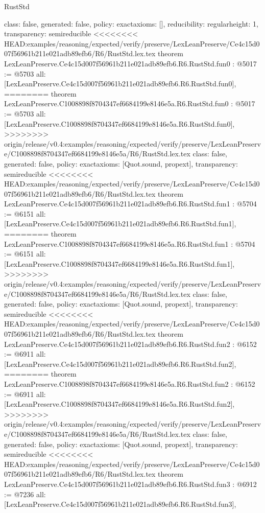 \begin{lexlean}{RustStd}
\begin{coremodule}
{\begin{coremodule}
{{{  class: false,
  generated: false,
  policy: exact{axioms: []},
  reducibility: regular{height: 1},
  transparency: semireducible
}
<<<<<<<< HEAD:examples/reasoning/expected/verify/preserve/LexLeanPreserve/Ce4c15d007f56961b211e021adb89efb6/R6/RustStd.lex.tex
theorem LexLeanPreserve.Ce4c15d007f56961b211e021adb89efb6.R6.RustStd.fun0 : @5017 := @5703 {
  all: [LexLeanPreserve.Ce4c15d007f56961b211e021adb89efb6.R6.RustStd.fun0],
========
theorem LexLeanPreserve.C1008898f8704347ef6684199e8146e5a.R6.RustStd.fun0 : @5017 := @5703 {
  all: [LexLeanPreserve.C1008898f8704347ef6684199e8146e5a.R6.RustStd.fun0],
>>>>>>>> origin/release/v0.4:examples/reasoning/expected/verify/preserve/LexLeanPreserve/C1008898f8704347ef6684199e8146e5a/R6/RustStd.lex.tex
  class: false,
  generated: false,
  policy: exact{axioms: [Quot.sound, propext]},
  transparency: semireducible
}
<<<<<<<< HEAD:examples/reasoning/expected/verify/preserve/LexLeanPreserve/Ce4c15d007f56961b211e021adb89efb6/R6/RustStd.lex.tex
theorem LexLeanPreserve.Ce4c15d007f56961b211e021adb89efb6.R6.RustStd.fun1 : @5704 := @6151 {
  all: [LexLeanPreserve.Ce4c15d007f56961b211e021adb89efb6.R6.RustStd.fun1],
========
theorem LexLeanPreserve.C1008898f8704347ef6684199e8146e5a.R6.RustStd.fun1 : @5704 := @6151 {
  all: [LexLeanPreserve.C1008898f8704347ef6684199e8146e5a.R6.RustStd.fun1],
>>>>>>>> origin/release/v0.4:examples/reasoning/expected/verify/preserve/LexLeanPreserve/C1008898f8704347ef6684199e8146e5a/R6/RustStd.lex.tex
  class: false,
  generated: false,
  policy: exact{axioms: [Quot.sound, propext]},
  transparency: semireducible
}
<<<<<<<< HEAD:examples/reasoning/expected/verify/preserve/LexLeanPreserve/Ce4c15d007f56961b211e021adb89efb6/R6/RustStd.lex.tex
theorem LexLeanPreserve.Ce4c15d007f56961b211e021adb89efb6.R6.RustStd.fun2 : @6152 := @6911 {
  all: [LexLeanPreserve.Ce4c15d007f56961b211e021adb89efb6.R6.RustStd.fun2],
========
theorem LexLeanPreserve.C1008898f8704347ef6684199e8146e5a.R6.RustStd.fun2 : @6152 := @6911 {
  all: [LexLeanPreserve.C1008898f8704347ef6684199e8146e5a.R6.RustStd.fun2],
>>>>>>>> origin/release/v0.4:examples/reasoning/expected/verify/preserve/LexLeanPreserve/C1008898f8704347ef6684199e8146e5a/R6/RustStd.lex.tex
  class: false,
  generated: false,
  policy: exact{axioms: [Quot.sound, propext]},
  transparency: semireducible
}
<<<<<<<< HEAD:examples/reasoning/expected/verify/preserve/LexLeanPreserve/Ce4c15d007f56961b211e021adb89efb6/R6/RustStd.lex.tex
theorem LexLeanPreserve.Ce4c15d007f56961b211e021adb89efb6.R6.RustStd.fun3 : @6912 := @7236 {
  all: [LexLeanPreserve.Ce4c15d007f56961b211e021adb89efb6.R6.RustStd.fun3],
}}}}}}
\end{coremodule}}
\end{coremodule}
\end{lexlean}
